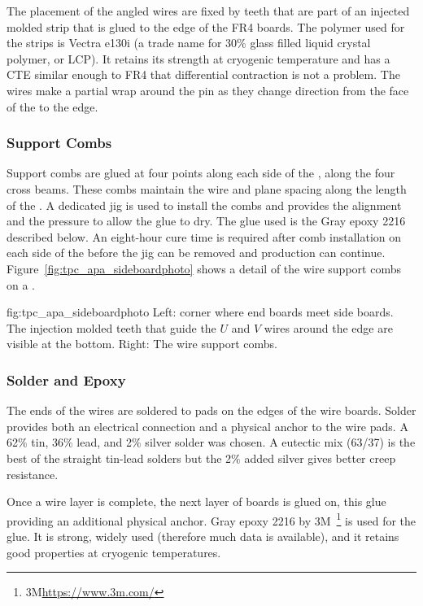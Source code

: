 The placement of the angled wires are fixed by teeth that are part of an injected molded strip that is glued to the edge of the FR4 boards.  The polymer used for the strips is Vectra e130i (a trade name for 30$\%$ glass filled liquid crystal polymer, or LCP). It retains its strength at cryogenic temperature and has a CTE similar enough to FR4 that differential contraction is not a problem.  The wires make a partial wrap around the pin as they change direction from the face of the  to the edge.

\subsubsection{Support Combs}
\label{sec:combs}

Support combs are glued at four points along each side of the , along the four cross beams. These combs maintain the wire and plane spacing along the length of the . A dedicated jig is used to install the combs and provides the alignment and the pressure to allow the glue to dry. The glue used is the Gray epoxy \num{2216} described below. An eight-hour cure time is required after comb installation on each side of the  before the jig can be removed and production can continue.  Figure~\ref{fig:tpc_apa_sideboardphoto} shows a detail of the wire support combs on a  .

\begin{dunefigure}{fig:tpc_apa_sideboardphoto}
{Left:  corner where end boards meet side boards.  The injection molded teeth that guide the $U$ and $V$ wires around the edge are visible at the bottom. Right: The wire support combs.}
\setlength{\fboxsep}{0pt}
\setlength{\fboxrule}{0.5pt}
\quad
{}
\end{dunefigure}

\subsubsection{Solder and Epoxy}
\label{sec:glue-solder}

The ends of the wires are soldered to pads on the edges of the wire boards.  Solder provides both an electrical connection and a physical anchor to the wire pads. A 62$\%$ tin, 36$\%$ lead, and 2$\%$ silver solder was chosen.  A eutectic mix (63/37) is the best of the straight tin-lead 
 solders but the 2$\%$ added silver gives better creep resistance. 

Once a wire layer is complete, the next layer of boards is glued on, this glue providing an additional physical anchor. Gray epoxy \num{2216} by 3M~\footnote{3M\texttrademark \url{https://www.3m.com/}} is used for the glue.  It is strong, widely used (therefore much data is available), and it retains good properties at cryogenic temperatures.  

